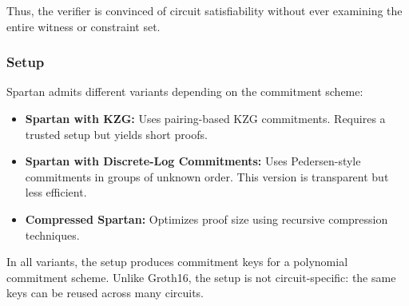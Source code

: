 Thus, the verifier is convinced of circuit satisfiability without ever examining the entire witness or constraint set.

\subsubsection*{Setup}

Spartan admits different variants depending on the commitment scheme:

\begin{itemize}
  \item \textbf{Spartan with KZG:} Uses pairing-based KZG commitments. Requires a trusted setup but yields short proofs.
  \item \textbf{Spartan with Discrete-Log Commitments:} Uses Pedersen-style commitments in groups of unknown order. This version is transparent but less efficient.
  \item \textbf{Compressed Spartan:} Optimizes proof size using recursive compression techniques.
\end{itemize}

In all variants, the setup produces commitment keys for a polynomial commitment scheme.  
Unlike Groth16, the setup is not circuit-specific: the same keys can be reused across many circuits.

\myspace

